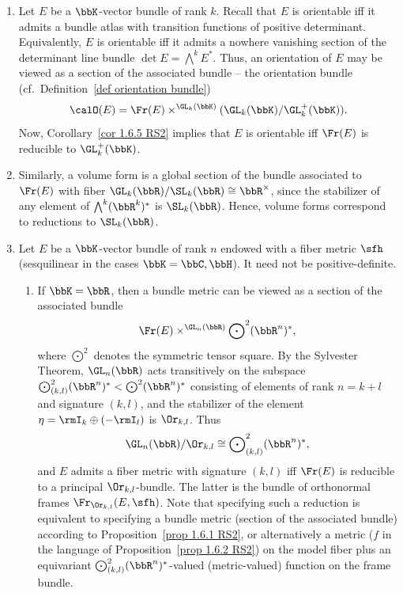 \begin{example}[{{\cite[Ex.~1.6.6]{RS2}}}]\label{ex 1.6.6 RS2}
    \begin{enumerate}
        \item Let $E$ be a $\bbK$-vector bundle of rank $k$. Recall that $E$ is orientable iff it admits a bundle atlas with transition functions of positive determinant. Equivalently, $E$ is orientable iff it admits a nowhere vanishing section of the determinant line bundle $\det E=\bigwedge\nolimits^k E^\ast$. Thus, an orientation of $E$ may be viewed as a section of the associated bundle -- the orientation bundle (cf.\ Definition~\ref{def orientation bundle})
        \[\calO(E)=\Fr(E)\times^{\GL_k(\bbK)}(\GL_k(\bbK)\slash \GL^+_k(\bbK)).\]
        Now, Corollary~\ref{cor 1.6.5 RS2} implies that $E$ is orientable iff $\Fr(E)$ is reducible to $\GL_k^+(\bbK)$.

        \item Similarly, a volume form is a global section of the bundle associated to $\Fr(E)$ with fiber $\GL_k(\bbR)\slash \SL_k(\bbR)\cong \bbR^\times$, since the stabilizer of any element of $\bigwedge\nolimits^k (\bbR^k)^\ast$ is $\SL_k(\bbR)$. Hence, volume forms correspond to reductions to $\SL_k(\bbR)$.

        \item Let $E$ be a $\bbK$-vector bundle of rank $n$ endowed with a fiber metric $\sfh$ (sesquilinear in the cases $\bbK=\bbC,\bbH$). It need not be positive-definite.
        \begin{enumerate}
            \item If $\bbK=\bbR$, then a bundle metric can be viewed as a section of the associated bundle
            \[\Fr(E)\times^{\GL_n(\bbR)} \bigodot\nolimits^2(\bbR^n)^\ast,\]
            where $\bigodot\nolimits^2$ denotes the symmetric tensor square. By the Sylvester Theorem, $\GL_n(\bbR)$ acts transitively on the subspace $\bigodot\nolimits^2_{(k,l)}(\bbR^n)^\ast< \bigodot\nolimits^2(\bbR^n)^\ast$ consisting of elements of rank $n=k+l$ and signature $(k,l)$, and the stabilizer of the element $\eta=\rmI_k\oplus (-\rmI_l)$ is $\Or_{k,l}$. Thus
            \[\GL_n(\bbR)\slash \Or_{k,l}\cong \bigodot\nolimits^2_{(k,l)}(\bbR^n)^\ast,\]
            and $E$ admits a fiber metric with signature $(k,l)$ iff $\Fr(E)$ is reducible to a principal $\Or_{k,l}$-bundle. The latter is the bundle of orthonormal frames $\Fr_{\Or_{k,l}}(E,\sfh)$. Note that specifying such a reduction is equivalent to specifying a bundle metric (section of the associated bundle) according to Proposition~\ref{prop 1.6.1 RS2}, or alternatively a metric ($f$ in the language of Proposition~\ref{prop 1.6.2 RS2}) on the model fiber plus an equivariant $\bigodot\nolimits^2_{(k,l)}(\bbR^n)^\ast$-valued (metric-valued) function on the frame bundle.


\end{enumerate}
\end{enumerate}
\end{example}
